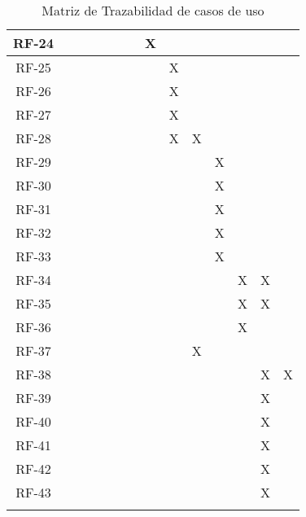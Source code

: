 \begin{center}
\begin{longtable}{ c || p{0.75cm} p{0.75cm} p{0.75cm} p{0.75cm} p{0.75cm} p{0.75cm} p{0.75cm} p{0.75cm} p{0.75cm} p{0.75cm} p{0.75cm} p{0.75cm} p{0.75cm}}
	RF-24 &  &  &  &  &  &  & X &  &  &  &  &  &  \\ \hline
	RF-25 &  &  &  &  &  &  &  & X &  &  &  &  &  \\ \hline
	RF-26 &  &  &  &  &  &  &  & X &  &  &  &  &  \\ \hline
	RF-27 &  &  &  &  &  &  &  & X &  &  &  &  &  \\ \hline
	RF-28 &  &  &  &  &  &  &  & X & X &  &  &  &  \\ \hline
	RF-29 &  &  &  &  &  &  &  &  &  & X &  &  &  \\ \hline
	RF-30 &  &  &  &  &  &  &  &  &  & X &  &  &  \\ \hline
	RF-31 &  &  &  &  &  &  &  &  &  & X &  &  &  \\ \hline
	RF-32 &  &  &  &  &  &  &  &  &  & X &  &  &  \\ \hline
	RF-33 &  &  &  &  &  &  &  &  &  & X &  &  &  \\ \hline
	RF-34 &  &  &  &  &  &  &  &  &  &  & X & X &  \\ \hline
	RF-35 &  &  &  &  &  &  &  &  &  &  & X & X &  \\ \hline
	RF-36 &  &  &  &  &  &  &  &  &  &  & X &  &  \\ \hline
	RF-37 &  &  &  &  &  &  &  &  & X &  &  &  &  \\ \hline
	RF-38 &  &  &  &  &  &  &  &  &  &  &  & X & X \\ \hline
	RF-39 &  &  &  &  &  &  &  &  &  &  &  & X &  \\ \hline
	RF-40 &  &  &  &  &  &  &  &  &  &  &  & X &  \\ \hline
	RF-41 &  &  &  &  &  &  &  &  &  &  &  & X &  \\ \hline
	RF-42 &  &  &  &  &  &  &  &  &  &  &  & X &  \\ \hline
	RF-43 &  &  &  &  &  &  &  &  &  &  &  & X &  \\ \hline
\caption{Matriz de Trazabilidad de casos de uso}
\label{tab:matriztraz}
\end{longtable}
\end{center}
